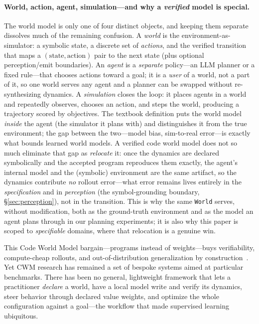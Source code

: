 \documentclass[11pt]{article}
\begin{document}
\paragraph{World, action, agent, simulation---and why a \emph{verified} model is
special.} The world model is only one of four distinct objects, and keeping them
separate dissolves much of the remaining confusion. A \emph{world} is the
environment-as-simulator: a symbolic state, a discrete set of \emph{actions}, and
the verified transition that maps a $(\textrm{state}, \textrm{action})$ pair to the
next state (plus optional perception/emit boundaries). An \emph{agent} is a
\emph{separate} policy---an LLM planner or a fixed rule---that chooses actions
toward a goal; it is a \emph{user} of a world, not a part of it, so one world serves
any agent and a planner can be swapped without re-synthesizing dynamics. A
\emph{simulation} closes the loop: it places agents in a world and repeatedly
observes, chooses an action, and steps the world, producing a trajectory scored by
objectives. The textbook definition puts the world model \emph{inside} the agent
(the simulator it plans with) and distinguishes it from the true environment; the
gap between the two---model bias, sim-to-real error---is exactly what bounds learned
world models. A verified code world model does not so much eliminate that gap as
\emph{relocate} it: once the dynamics are declared symbolically and the accepted
program reproduces them exactly, the agent's internal model and the (symbolic)
environment are the same artifact, so the dynamics contribute \emph{no} rollout
error---what error remains lives entirely in the \emph{specification} and in
\emph{perception} (the symbol-grounding boundary, \S\ref{sec:perception}),
not in the transition. This is why the same \texttt{World} serves, without
modification, both as the ground-truth environment and as the model an agent plans
through in our planning experiments; it is also why this paper is scoped to
\emph{specifiable} domains, where that relocation is a genuine win.

This Code World Model bargain---programs instead of weights---buys verifiability,
compute-cheap rollouts,
and out-of-distribution generalization by construction~\cite{worldcoder2024,
gifmcts2024, poeworld2025, cwmgames2025}. Yet CWM research has remained a set
of bespoke systems aimed at particular benchmarks. There has been no general,
lightweight framework that lets a practitioner \emph{declare} a world, have a
local model write and verify its dynamics, steer behavior through declared
value weights, and optimize the whole configuration against a goal---the
workflow that made supervised learning ubiquitous.
\end{document}
